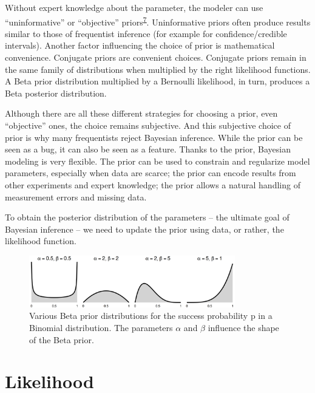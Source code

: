 \documentclass[
  10pt,
]{scrbook}
\begin{document}
Without expert knowledge about the parameter, the modeler can use ``uninformative'' or ``objective'' priors\textsuperscript{\protect\hyperlink{ref-yang1996catalog}{7}}.
Uninformative priors often produce results similar to those of frequentist inference (for example for confidence/credible intervals).
Another factor influencing the choice of prior is mathematical convenience.
Conjugate priors are convenient choices.
Conjugate priors remain in the same family of distributions when multiplied by the right likelihood functions.
A Beta prior distribution multiplied by a Bernoulli likelihood, in turn, produces a Beta posterior distribution.

Although there are all these different strategies for choosing a prior, even ``objective'' ones, the choice remains subjective.
And this subjective choice of prior is why many frequentists reject Bayesian inference.
While the prior can be seen as a bug, it can also be seen as a feature.
Thanks to the prior, Bayesian modeling is very flexible.
The prior can be used to constrain and regularize model parameters, especially when data are scarce;
the prior can encode results from other experiments and expert knowledge;
the prior allows a natural handling of measurement errors and missing data.

To obtain the posterior distribution of the parameters -- the ultimate goal of Bayesian inference -- we need to update the prior using data, or rather, the likelihood function.

\begin{figure}

{\centering \includegraphics[width=0.8\textwidth]{figures/priors-1} 

}

\caption{Various Beta prior distributions for the success probability p in a Binomial distribution. The parameters $\alpha$ and $\beta$ influence the shape of the Beta prior.}\label{fig:priors}
\end{figure}

\hypertarget{likelihood}{%
\section{Likelihood}\label{likelihood}}
\end{document}
